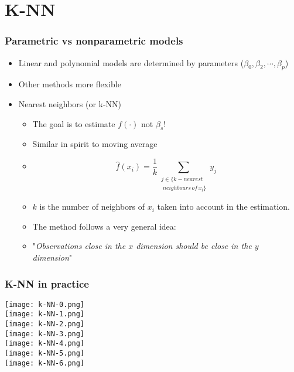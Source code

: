 \documentclass[xcolor=x11names,compress, aspectratio=169]{beamer}
\renewcommand{\(}{\begin{columns}}
\renewcommand{\)}{\end{columns}}
\newcommand{\<}[1]{\begin{column}{#1}}
\renewcommand{\>}{\end{column}}
\begin{document}
\section{K-NN}

\begin{frame} %
\frametitle{Parametric vs nonparametric models}

\begin{itemize}[<+->]
     \item Linear and polynomial models are determined by parameters ($\beta_0, \beta_2, \cdots, \beta_p$)
     \item Other methods more flexible
       \item Nearest neighbors  (or k-NN)
     \begin{itemize}[<+->]
         \item[] The goal is to estimate $f(\cdot)$ not $\beta_s$!
         \item[] Similar in spirit to moving average
         \item[] $$ \widehat{f} (x_i) = \frac{1}{k} \sum_{\substack{j \in \{ k-nearest \\ \; neighbours \, of \, x_i \} }}  y_j$$
         \item[] $k$ is the number of neighbors of $x_i$ taken into account in the estimation.
         \item The method follows a very general idea:
         \item[]  "\emph{Observations close in the $x$ dimension should be close in the $y$ dimension}"  
     \end{itemize}
\end{itemize}
\end{frame}


\begin{frame}
\frametitle{\textcolor{brique}{ K-NN in practice}}
\begin{center}
\begin{itemize}
    {\texttt{[image: k-NN-0.png]} \\ }
    {\texttt{[image: k-NN-1.png]} \\ }
    {\texttt{[image: k-NN-2.png]} \\ }
    {\texttt{[image: k-NN-3.png]} \\ }
    {\texttt{[image: k-NN-4.png]} \\ }
    {\texttt{[image: k-NN-5.png]} \\ }
    {\texttt{[image: k-NN-6.png]} \\ }
\end{itemize}
\end{center}
\end{frame}
\end{document}
